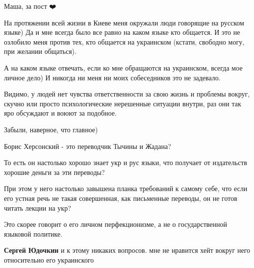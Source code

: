 \begin{itemize}
\begin{itemize}
\end{itemize}

 

Маша, за пост ❤️

На протяжении всей жизни в Киеве меня окружали люди говорящие на русском языке)
Да и мне всегда было все равно на каком языке кто общается. И это не озлобило
меня против тех, кто общается на украинском (кстати, свободно могу, при желании
общаться). 

А на каком языке отвечать, если ко мне обращаются на украинском, всегда мое
личное дело) И никогда ни меня ни моих собеседников это не задевало.

Видимо, у людей нет чувства ответственности за свою жизнь и проблемы вокруг,
скучно или просто психологические нерешенные ситуации внутри, раз они так яро
обсуждают и воюют за подобное. 

Забыли, наверное, что главное)


 

Борис Херсонский - это переводчик Тычины и Жадана? 

То есть он настолько хорошо знает укр и рус языки, что получает от издательств
хорошие деньги за эти переводы? 

При этом у него настолько завышена планка требований к самому себе, что если
его устная речь не такая совершенная, как письменные переводы, он не готов
читать лекции на укр? 

Это скорее говорит о его личном перфекционизме, а не о государственной языковой
политике.

\begin{itemize}
 
\textbf{Сергей Юдочкин} и к этому никаких вопросов. мне не нравится хейт вокруг него относительно его украинского
\end{itemize}


\end{itemize}
